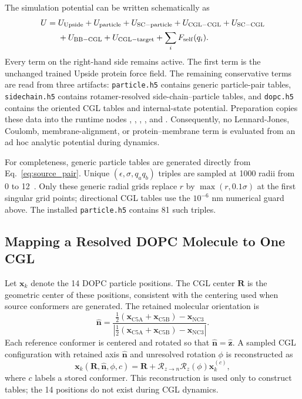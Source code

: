 \documentclass{article}
\newcommand{\angstrom}{\text{\normalfont\AA}}
\begin{document}
The simulation potential can be written schematically as
\begin{align}
U={}&U_{\mathrm{Upside}}+U_{\mathrm{particle}}
+U_{\mathrm{SC-particle}}+U_{\mathrm{CGL-CGL}}
+U_{\mathrm{SC-CGL}} \notag\\
&+U_{\mathrm{BB-CGL}}+U_{\mathrm{CGL-target}}
+\sum_i F_{\mathrm{self}}(q_i).
\label{eq:runtime_sum}
\end{align}
Every term on the right-hand side remains active.  The first term is the
unchanged trained Upside protein force field.  The remaining conservative
terms are read from three artifacts: \texttt{particle.h5} contains generic
particle-pair tables, \texttt{sidechain.h5} contains rotamer-resolved
side-chain--particle tables, and \texttt{dopc.h5} contains the oriented CGL
tables and internal-state potential.  Preparation copies these data into the
runtime nodes ,
, ,
, and .  Consequently, no
Lennard-Jones, Coulomb, membrane-alignment, or protein--membrane term is
evaluated from an ad hoc analytic potential during dynamics.

For completeness, generic particle tables are generated directly from
Eq.~\ref{eq:source_pair}.  Unique $(\epsilon,\sigma,q_aq_b)$ triples are sampled
at 1000 radii from 0 to 12~\angstrom.  Only these generic radial grids replace
$r$ by $\max(r,0.1\sigma)$ at the first singular grid points; directional CGL
tables use the $10^{-6}$ nm numerical guard above.  The installed
\texttt{particle.h5} contains 81 such triples.

\subsection{Mapping a Resolved DOPC Molecule to One CGL}

Let $\mathbf x_k$ denote the 14 DOPC particle positions.  The CGL center
$\mathbf R$ is the geometric center of these positions, consistent with the
centering used when source conformers are generated.  The retained molecular
orientation is
\begin{equation}
\hat{\mathbf n}=\frac{\frac12(\mathbf x_{\mathrm{C5A}}
+\mathbf x_{\mathrm{C5B}})-\mathbf x_{\mathrm{NC3}}}
{\left|\frac12(\mathbf x_{\mathrm{C5A}}
+\mathbf x_{\mathrm{C5B}})-\mathbf x_{\mathrm{NC3}}\right|}.
\label{eq:cgl_axis}
\end{equation}
Each reference conformer is centered and rotated so that
$\hat{\mathbf n}=\hat{\mathbf z}$.  A sampled CGL configuration with retained
axis $\hat{\mathbf n}$ and unresolved rotation $\phi$ is reconstructed as
\begin{equation}
\mathbf x_k(\mathbf R,\hat{\mathbf n},\phi,c)
=\mathbf R+\mathcal R_{z\rightarrow n}
\mathcal R_z(\phi)\mathbf x_k^{(c)},
\label{eq:reconstruction}
\end{equation}
where $c$ labels a stored conformer.  This reconstruction is used only to
construct tables; the 14 positions do not exist during CGL dynamics.
\end{document}
